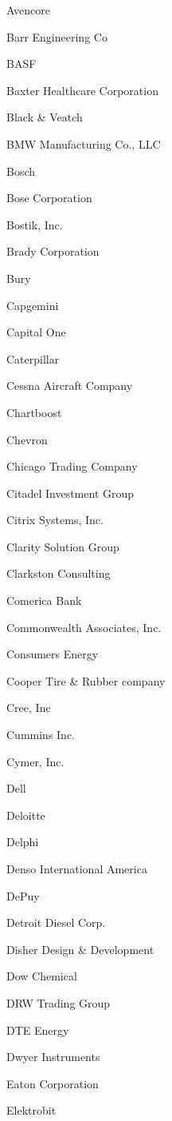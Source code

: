 \documentclass[twoside]{article}
\begin{document}
\begin{center}
\begin{multicols}{5}
\begin{FlushLeft}
\begin{compactitem}
\item Avencore
\item Barr Engineering Co
\item BASF
\item Baxter Healthcare Corporation
\item Black \& Veatch
\item BMW Manufacturing Co., LLC
\item Bosch
\item Bose Corporation
\item Bostik, Inc.
\item Brady Corporation
\item Bury
\item Capgemini
\item Capital One
\item Caterpillar
\item Cessna Aircraft Company
\item Chartboost
\item Chevron
\item Chicago Trading Company
\item Citadel Investment Group
\item Citrix Systems, Inc.
\item Clarity Solution Group
\item Clarkston Consulting
\item Comerica Bank
\item Commonwealth Associates, Inc.
\item Consumers Energy
\item Cooper Tire \& Rubber company
\item Cree, Inc
\item Cummins Inc.
\item Cymer, Inc.
\item Dell
\item Deloitte
\item Delphi
\item Denso International America
\item DePuy
\item Detroit Diesel Corp.
\item Disher Design \& Development
\item Dow Chemical
\item DRW Trading Group
\item DTE Energy
\item Dwyer Instruments
\item Eaton Corporation
\item Elektrobit

\end{compactitem}
\end{FlushLeft}
\end{multicols}
\end{center}
\end{document}
